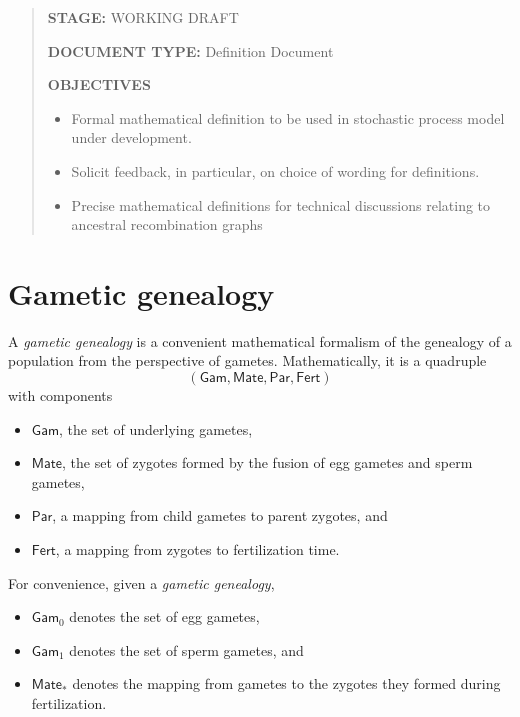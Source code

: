 \documentclass{article}
\begin{document}
\newcommand{\mathstop}{\text{ .}}
\newcommand{\dom}{\operatorname{dom}}
\newcommand{\rng}{\operatorname{rng}}
\newcommand{\Gam}{\mathsf{Gam}}
\newcommand{\Mate}{\mathsf{Mate}}
\newcommand{\Par}{\mathsf{Par}}
\newcommand{\Fert}{\mathsf{Fert}}
\newcommand{\Loc}{\mathsf{Loc}}
\newcommand{\Lin}{\mathsf{Lin}}
\newcommand{\Leg}{\mathsf{Leg}}
\newcommand{\Nodes}{\mathsf{Nodes}}


\begin{abstract}
\textbf{STAGE:} WORKING DRAFT

\textbf{DOCUMENT TYPE:} Definition Document

\textbf{OBJECTIVES}

\begin{itemize}
\item
  Formal mathematical definition to be used in stochastic process model
  under development.
\item
  Solicit feedback, in particular, on choice of wording for definitions.
\item
  Precise mathematical definitions for technical discussions relating to
  ancestral recombination graphs
\end{itemize}
\end{abstract}


\section{Gametic genealogy}

A \emph{gametic genealogy} is a convenient mathematical formalism of the
genealogy of a population from the perspective of gametes.
Mathematically, it is a quadruple \[
(\Gam, \Mate, \Par, \Fert) 
\] with components

\begin{itemize}
\tightlist
\item
  \(\Gam\), the set of underlying gametes,
\item
  \(\Mate\), the set of zygotes formed by the fusion of egg gametes and
  sperm gametes,
\item
  \(\Par\), a mapping from child gametes to parent zygotes, and
\item
  \(\Fert\), a mapping from zygotes to fertilization time.
\end{itemize}

For convenience, given a \emph{gametic genealogy},

\begin{itemize}
\tightlist
\item
  \(\Gam_0\) denotes the set of egg gametes,
\item
  \(\Gam_1\) denotes the set of sperm gametes, and
\item
  \(\Mate_*\) denotes the mapping from gametes to the zygotes they
  formed during fertilization.
\end{itemize}
\end{document}
